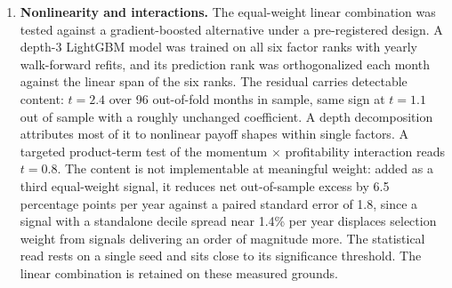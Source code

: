 \documentclass[11pt,a4paper]{article}
\begin{document}
\begin{enumerate}
\begin{itemize}
    \citep{loupolk2022}, built from residual pairwise correlations
    within momentum deciles, flags states in which forward hedged
    returns are on average higher than in calm states: the risk is
    compensated. A de-risking rule on it avoided all four worst months
    of 2019--2024 and still gave up 76 percentage points of total
    return, with the Sharpe ratio falling from 1.56 to 1.02, under an
    in-sample threshold and zero switching costs. Constant half-sizing
    at matched volatility keeps the full 1.56, so the rule is dominated
    by running smaller.
  \end{itemize}
  No early-warning variable for the remaining factor-internal drawdowns
  was validated.
  \item \textbf{Nonlinearity and interactions.} The equal-weight linear
  combination was tested against a gradient-boosted alternative under a
  pre-registered design. A depth-3 LightGBM model was trained on all six
  factor ranks with yearly walk-forward refits, and its prediction rank
  was orthogonalized each month against the linear span of the six ranks.
  The residual carries detectable content: $t{=}2.4$ over 96 out-of-fold
  months in sample, same sign at $t{=}1.1$ out of sample with a roughly
  unchanged coefficient. A depth decomposition attributes most of it to
  nonlinear payoff shapes within single factors. A targeted product-term
  test of the momentum $\times$ profitability interaction reads
  $t{=}0.8$. The content is not implementable at meaningful weight: added
  as a third equal-weight signal, it reduces net out-of-sample excess by
  6.5 percentage points per year against a paired standard error of 1.8,
  since a signal with a standalone decile spread near 1.4\% per year
  displaces selection weight from signals delivering an order of
  magnitude more. The statistical read rests on a single seed and sits
  close to its significance threshold. The linear combination is retained
  on these measured grounds.
\end{enumerate}
\end{document}
